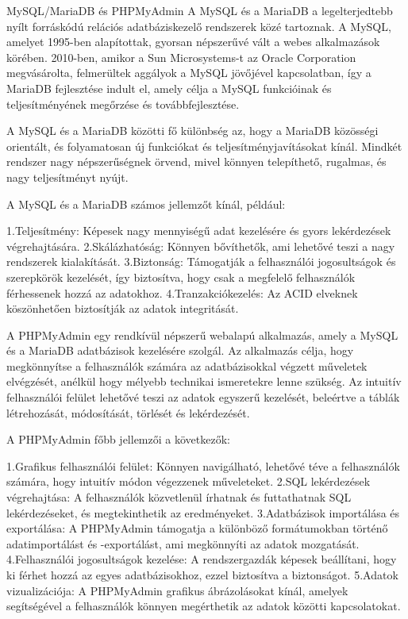 \documentclass[colorlinks]{thesis-kando}
\theoremstyle{definition}
\theoremstyle{remark}
\begin{document}
MySQL/MariaDB és PHPMyAdmin
A MySQL és a MariaDB a legelterjedtebb nyílt forráskódú relációs adatbáziskezelő rendszerek közé tartoznak. A MySQL, amelyet 1995-ben alapítottak, gyorsan népszerűvé vált a webes alkalmazások körében. 2010-ben, amikor a Sun Microsystems-t az Oracle Corporation megvásárolta, felmerültek aggályok a MySQL jövőjével kapcsolatban, így a MariaDB fejlesztése indult el, amely célja a MySQL funkcióinak és teljesítményének megőrzése és továbbfejlesztése.

A MySQL és a MariaDB közötti fő különbség az, hogy a MariaDB közösségi orientált, és folyamatosan új funkciókat és teljesítményjavításokat kínál. Mindkét rendszer nagy népszerűségnek örvend, mivel könnyen telepíthető, rugalmas, és nagy teljesítményt nyújt.

A MySQL és a MariaDB számos jellemzőt kínál, például:

1.Teljesítmény: Képesek nagy mennyiségű adat kezelésére és gyors lekérdezések végrehajtására.
2.Skálázhatóság: Könnyen bővíthetők, ami lehetővé teszi a nagy rendszerek kialakítását.
3.Biztonság: Támogatják a felhasználói jogosultságok és szerepkörök kezelését, így biztosítva, hogy csak a megfelelő felhasználók férhessenek hozzá az adatokhoz.
4.Tranzakciókezelés: Az ACID elveknek köszönhetően biztosítják az adatok integritását.

A PHPMyAdmin egy rendkívül népszerű webalapú alkalmazás, amely a MySQL és a MariaDB adatbázisok kezelésére szolgál. Az alkalmazás célja, hogy megkönnyítse a felhasználók számára az adatbázisokkal végzett műveletek elvégzését, anélkül hogy mélyebb technikai ismeretekre lenne szükség. Az intuitív felhasználói felület lehetővé teszi az adatok egyszerű kezelését, beleértve a táblák létrehozását, módosítását, törlését és lekérdezését.

A PHPMyAdmin főbb jellemzői a következők:

1.Grafikus felhasználói felület: Könnyen navigálható, lehetővé téve a felhasználók számára, hogy intuitív módon végezzenek műveleteket.
2.SQL lekérdezések végrehajtása: A felhasználók közvetlenül írhatnak és futtathatnak SQL lekérdezéseket, és megtekinthetik az eredményeket.
3.Adatbázisok importálása és exportálása: A PHPMyAdmin támogatja a különböző formátumokban történő adatimportálást és -exportálást, ami megkönnyíti az adatok mozgatását.
4.Felhasználói jogosultságok kezelése: A rendszergazdák képesek beállítani, hogy ki férhet hozzá az egyes adatbázisokhoz, ezzel biztosítva a biztonságot.
5.Adatok vizualizációja: A PHPMyAdmin grafikus ábrázolásokat kínál, amelyek segítségével a felhasználók könnyen megérthetik az adatok közötti kapcsolatokat.
\end{document}
